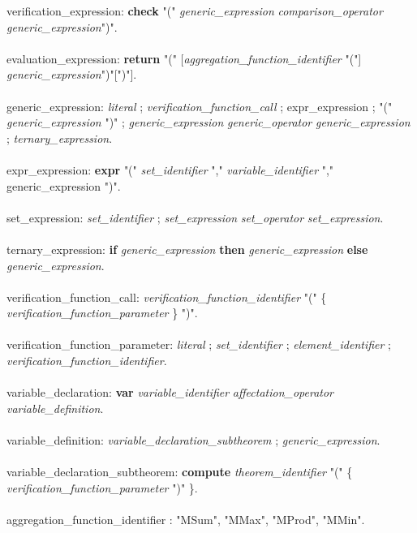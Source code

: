 {\begin{grammar}
verification\_expression: \textbf {check} "("
\textit{generic\_expression} \textit{comparison\_operator}
\textit{generic\_expression}")".\\
\\
evaluation\_expression: \textbf {return} "("
[\textit{aggregation\_function\_identifier} "("]
\textit{generic\_expression}")"[")"].\\
\\
generic\_expression: \textit{literal} ; \textit
{verification\_function\_call} ; expr\_expression ; 
"(" \textit{generic\_expression} ")" ;
\textit{generic\_expression} \textit{generic\_operator} 
\textit{generic\_expression} ; \textit{ternary\_expression}.\\
\\
expr\_expression: \textbf{expr} "(" \textit{set\_identifier} "," \textit{variable\_identifier} "," {generic\_expression} ")".\\
\\
set\_expression: \textit{set\_identifier} ; \textit{set\_expression}
\textit{set\_operator} \textit{set\_expression}.\\
\\
ternary\_expression: \textbf{if} \textit{generic\_expression} \textbf{then} \textit{generic\_expression} \textbf{else} \textit{generic\_expression}.\\
\\
verification\_function\_call:
\textit{verification\_function\_identifier} "(" \{
\textit{verification\_function\_parameter} \} ")".\\
\\
verification\_function\_parameter: \textit{literal} ;
\textit{set\_identifier} ; \textit{element\_identifier} ; \textit
{verification\_function\_identifier}.\\
\\
variable\_declaration: \textbf{var} \textit{variable\_identifier} \textit{affectation\_operator} \textit{variable\_definition}.\\
\\
variable\_definition: \textit{variable\_declaration\_subtheorem} ; \textit{generic\_expression}.\\
\\
variable\_declaration\_subtheorem: \textbf{compute} \textit{theorem\_identifier} "(" \{ \textit{verification\_function\_parameter} ")" \}.\\
\\
aggregation\_function\_identifier : "MSum", "MMax", "MProd", "MMin".\\

\end{grammar}}
